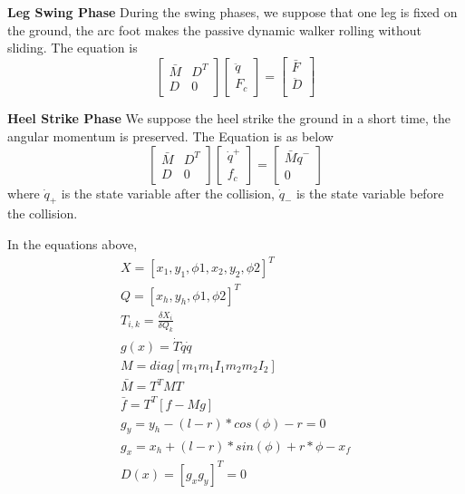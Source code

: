 \textbf{Leg Swing Phase}
During the swing phases, we suppose that one leg is fixed on the ground, the arc foot makes the passive dynamic walker rolling without sliding.
The equation is 
\begin{equation}
\left[
\begin{array}{cc}
\bar{M} &D^{T}\\
D&	0 
\end{array}
\right]
\left[
\begin{array}{c}
\ddot{q} \\
F_{c}
\end{array}
\right]
=
\left[
\begin{array}{c}
\bar{F}\\
\ddot{D}\\
\end{array}
\right]
\end{equation}


\textbf{Heel Strike Phase}
We suppose the heel strike the ground in a short time, the angular momentum is preserved.
The Equation is as below
\begin{equation}
\left[
\begin{array}{cc}
\bar {M}& D^{T}\\
D	& 0
\end{array}
\right]
\left[
\begin{array}{c}
\dot{q}^{+}\\
f_{c}	
\end{array}
\right]
=
\left[
\begin{array}{c}
\bar{M}\dot{q}^{-}\\
0
\end{array}
\right]
\end{equation}
where $\dot{q}_{+}$ is the state variable after the collision, $\dot{q}_{-}$ is the state variable before the collision.



In the equations above,
\begin{eqnarray}
X=[x_{1},y_{1},\phi{1},x_{2},y_{2},\phi{2}]^{T} \nonumber\\
Q=[x_{h},y_{h},\phi{1},\phi{2}]^{T} \nonumber \\
T_{i,k}=\frac{\delta X_{i}}{ \delta Q_{k}} \nonumber \\
g(x)=\dot{T} \dot{q} \dot{q}	\nonumber \\
M=diag[m_{1} m_{1} I_{1} m_{2} m_{2} I_{2}] \nonumber \\
\bar{M}=T^{T}MT	\nonumber \\
\bar{f}=T^{T}[f-Mg]\nonumber \\
g_{y}=y_{h}-(l-r)*cos(\phi)-r=0 \nonumber \\
g_{x}=x_{h}+(l-r)*sin(\phi)+r*\phi-x_{f}\nonumber \\
D(x)=[g_{x}  g_{y}]^T=0 \nonumber
\end{eqnarray}

